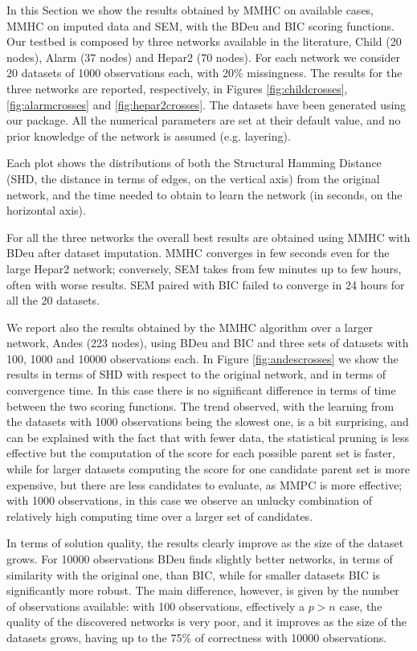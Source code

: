 \documentclass{article}\usepackage[]{graphicx}\usepackage[]{color}
\begin{document}
In this Section we show the results obtained by MMHC on available cases, MMHC on imputed data and SEM, with the BDeu and BIC scoring functions. Our testbed is composed by three networks available in the literature, Child (20 nodes), Alarm (37 nodes) and Hepar2 (70 nodes). For each network we consider 20 datasets of 1000 observations each, with 20\% missingness. The results for the three networks are reported, respectively, in Figures \ref{fig:childcrosses}, \ref{fig:alarmcrosses} and \ref{fig:hepar2crosses}. The datasets have been generated using our package. All the numerical parameters are set at their default value, and no prior knowledge of the network is assumed (e.g. layering).

Each plot shows the distributions of both the Structural Hamming Distance (SHD, the distance in terms of edges, on the vertical axis) from the original network, and the time needed to obtain to learn the network (in seconds, on the horizontal axis).

For all the three networks the overall best results are obtained using MMHC with BDeu after dataset imputation. MMHC converges in few seconds even for the large Hepar2 network; conversely, SEM takes from few minutes up to few hours, often with worse results. SEM paired with BIC failed to converge in 24 hours for all the 20 datasets.

We report also the results obtained by the MMHC algorithm over a larger network, Andes (223 nodes), using BDeu and BIC and three sets of datasets with 100, 1000 and 10000 observations each. In Figure \ref{fig:andescrosses} we show the results in terms of SHD with respect to the original network, and in terms of convergence time. In this case there is no significant difference in terms of time between the two scoring functions.
The trend observed, with the learning from the datasets with 1000 observations being the slowest one, is a bit surprising, and can be explained with the fact that with fewer data, the statistical pruning is less effective but the computation of the score for each possible parent set is faster, while for larger datasets computing the score for one candidate parent set is more expensive, but there are less candidates to evaluate, as MMPC is more effective; with 1000 observations, in this case we observe an unlucky combination of relatively high computing time over a larger set of candidates.

In terms of solution quality, the results clearly improve as the size of the dataset grows. For 10000 observations BDeu finds slightly better networks, in terms of similarity with the original one, than BIC, while for smaller datasets BIC is significantly more robust. The main difference, however, is given by the number of observations available: with 100 observations, effectively a $p>n$ case, the quality of the discovered networks is very poor, and it improves as the size of the datasets grows, having up to the 75\% of correctness with 10000 observations.
\end{document}
